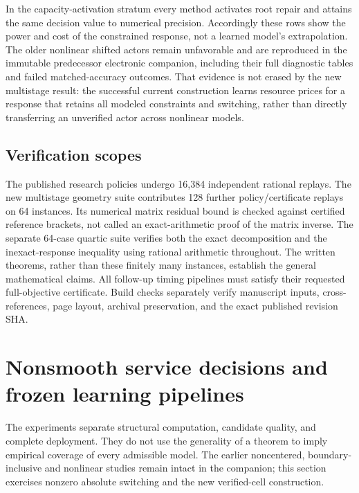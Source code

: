 \documentclass[11pt,letterpaper]{article}
\theoremstyle{definition}
\newcommand{\1}{\mathbf 1}
\begin{document}
In the capacity-activation stratum every method activates root repair and attains the same decision value to numerical precision. Accordingly these rows show the power and cost of the constrained response, not a learned model's extrapolation. The older nonlinear shifted actors remain unfavorable and are reproduced in the immutable predecessor electronic companion, including their full diagnostic tables and failed matched-accuracy outcomes. That evidence is not erased by the new multistage result: the successful current construction learns resource prices for a response that retains all modeled constraints and switching, rather than directly transferring an unverified actor across nonlinear models.

\subsection{Verification scopes}
The published research policies undergo 16,384 independent rational replays. The new multistage geometry suite contributes 128 further policy/certificate replays on 64 instances. Its numerical matrix residual bound is checked against certified reference brackets, not called an exact-arithmetic proof of the matrix inverse. The separate 64-case quartic suite verifies both the exact decomposition and the inexact-response inequality using rational arithmetic throughout. The written theorems, rather than these finitely many instances, establish the general mathematical claims. All follow-up timing pipelines must satisfy their requested full-objective certificate. Build checks separately verify manuscript inputs, cross-references, page layout, archival preservation, and the exact published revision SHA.




\section{Nonsmooth service decisions and frozen learning pipelines}\label{sec:r13-experiment}
The experiments separate structural computation, candidate quality, and complete deployment. They do not use the generality of a theorem to imply empirical coverage of every admissible model. The earlier noncentered, boundary-inclusive and nonlinear studies remain intact in the companion; this section exercises nonzero absolute switching and the new verified-cell construction.
\end{document}
